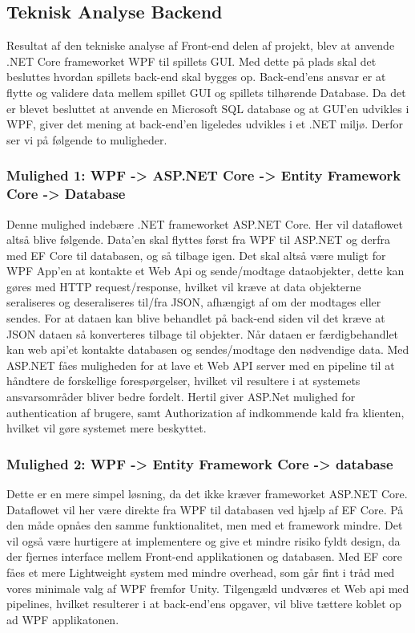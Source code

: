 \subsection{Teknisk Analyse Backend}

Resultat af den tekniske analyse af Front-end delen af projekt, blev at anvende .NET Core frameworket WPF til spillets GUI. Med dette på plads skal det besluttes hvordan spillets back-end skal bygges op. Back-end’ens ansvar er at flytte og validere data mellem spillet GUI og spillets tilhørende Database. Da det er blevet besluttet at anvende en Microsoft SQL database og at GUI’en udvikles i WPF, giver det mening at back-end’en ligeledes udvikles i et .NET miljø. Derfor ser vi på følgende to muligheder.\\


\subsubsection{Mulighed 1: WPF -> ASP.NET Core -> Entity Framework Core -> Database}
Denne mulighed indebære .NET frameworket ASP.NET Core. Her vil dataflowet altså blive følgende. Data’en skal flyttes først fra WPF til ASP.NET og derfra med EF Core til databasen, og så tilbage igen.
Det skal altså være muligt for WPF App’en at kontakte et Web Api og sende/modtage dataobjekter, dette kan gøres med HTTP request/response, hvilket vil kræve at data objekterne seraliseres og deseraliseres til/fra JSON, afhængigt af om der modtages eller sendes. For at dataen kan blive behandlet på back-end siden vil det kræve at JSON dataen så konverteres tilbage til objekter. Når dataen er færdigbehandlet kan web api’et kontakte databasen og sendes/modtage den nødvendige data. Med ASP.NET fåes muligheden for at lave et Web API server med en pipeline til at håndtere de forskellige forespørgelser, hvilket vil resultere i at systemets ansvarsområder bliver bedre fordelt. Hertil giver ASP.Net mulighed for authentication af brugere, samt Authorization af indkommende kald fra klienten, hvilket vil gøre systemet mere beskyttet. \\


\subsubsection{Mulighed 2: WPF -> Entity Framework Core -> database}

Dette er en mere simpel løsning, da det ikke kræver frameworket ASP.NET Core. Dataflowet vil her være direkte fra WPF til databasen ved hjælp af EF Core. På den måde opnåes den samme funktionalitet, men med et framework mindre. Det vil også være hurtigere at implementere og give et mindre risiko fyldt design, da der fjernes interface mellem Front-end applikationen og databasen. Med EF core fåes et mere Lightweight system med mindre overhead, som går fint i tråd med vores minimale valg af WPF fremfor Unity. Tilgengæld undværes et Web api med pipelines, hvilket resulterer i at back-end’ens opgaver, vil blive tættere koblet op ad WPF applikatonen.\\

